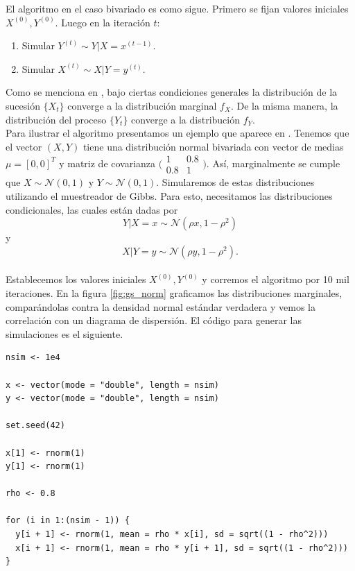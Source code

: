 \documentclass[11pt,a4paper]{article}
\begin{document}
El algoritmo en el caso bivariado es como sigue. Primero se fijan valores iniciales $X^{(0)}, Y^{(0)}$. Luego en la iteración $t$:
\begin{enumerate}
\item Simular $Y^{(t)} \sim Y|X = x^{(t-1)}$.
\item Simular $X^{(t)} \sim X|Y = y^{(t)}$.
\end{enumerate}

Como se menciona en \citet{casella_gs}, bajo ciertas condiciones generales la distribución de la sucesión $\lbrace X_t \rbrace$ converge a la distribución marginal $f_X$. De la misma manera, la distribución del proceso $\lbrace Y_t \rbrace$ converge a la distribución $f_Y$.\\

Para ilustrar el algoritmo presentamos un ejemplo que aparece en \citet{casella}. Tenemos que el vector $(X, Y)$ tiene una distribución normal bivariada con vector de medias $\mu = [0, 0]^T$ y matriz de covarianza $\big(\begin{smallmatrix}
  1 & 0.8\\
  0.8 & 1
\end{smallmatrix}\big)$. Así, marginalmente se cumple que $X \sim \mathcal{N}(0, 1)$ y $Y \sim \mathcal{N}(0, 1)$. Simularemos de estas distribuciones utilizando el muestreador de Gibbs. Para esto, necesitamos las distribuciones condicionales, las cuales están dadas por $$Y|X = x \sim \mathcal{N}(\rho x, 1 - \rho^2)$$ y $$X|Y = y \sim \mathcal{N}(\rho y, 1 - \rho^2).$$\\

Establecemos los valores iniciales $X^{(0)}, Y^{(0)}$ y corremos el algoritmo por 10 mil iteraciones. En la figura \ref{fig:gs_norm} graficamos las distribuciones marginales, comparándolas contra la densidad normal estándar verdadera y vemos la correlación con un diagrama de dispersión. El código para generar las simulaciones es el siguiente.\\

\begin{lstlisting}
nsim <- 1e4

x <- vector(mode = "double", length = nsim)
y <- vector(mode = "double", length = nsim)

set.seed(42)

x[1] <- rnorm(1)
y[1] <- rnorm(1)

rho <- 0.8

for (i in 1:(nsim - 1)) {
  y[i + 1] <- rnorm(1, mean = rho * x[i], sd = sqrt((1 - rho^2)))
  x[i + 1] <- rnorm(1, mean = rho * y[i + 1], sd = sqrt((1 - rho^2)))
}
\end{lstlisting}
\end{document}
